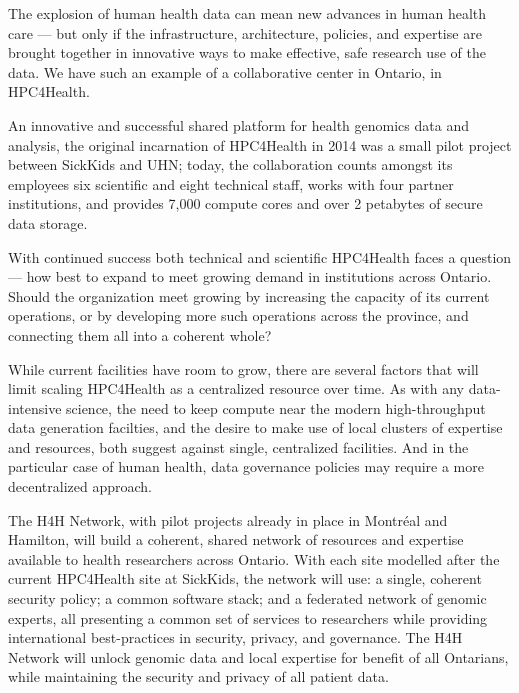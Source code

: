 \documentclass[twoside,symmetric,sfsidenotes,notoc]{tufte-book}
\begin{document}
\begin{fullwidth}
The explosion of human health data can mean new advances in human health care ---
but only if the infrastructure, architecture, policies, and expertise are brought
together in innovative ways to make effective, safe research use of the data.
We have such an example of a collaborative center in Ontario, in HPC4Health.

An innovative and successful shared platform for health genomics data and analysis,
the original incarnation of HPC4Health in 2014 was a small pilot project between
SickKids and UHN; today, the collaboration counts amongst its employees six scientific 
and eight technical staff, works with four partner institutions, and provides 7,000
compute cores and over 2 petabytes of secure data storage.

With continued success both technical and scientific HPC4Health faces a question --- 
how best to expand to meet growing demand in institutions across Ontario.  Should 
the organization meet growing by increasing the capacity of its current operations,
or by developing more such operations across the province, and connecting them
all into a coherent whole?

While current facilities have room to grow, there are several factors that will limit
scaling HPC4Health as a centralized resource over time.  As with any data-intensive science,
the need to keep compute near the modern high-throughput data generation facilties,
and the desire to make use of local clusters of expertise and resources, both suggest
against single, centralized facilities.  And in the particular case of human health, 
data governance policies may require a more decentralized approach.

The H4H Network, with pilot projects already in place in Montr\'eal and
Hamilton, will build a coherent, shared network of resources and expertise available
to health researchers across Ontario.  With each site modelled after the current HPC4Health
site at SickKids, the network will use: a single, coherent security policy; a common
software stack; and a federated network of genomic experts, all presenting a common
set of services to researchers while providing international best-practices in security, privacy,
and governance.  The H4H Network will unlock genomic data and local expertise for
benefit of all Ontarians, while maintaining the security and privacy of all
patient data.
\end{fullwidth}

\mainmatter
\end{document}
